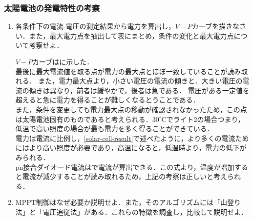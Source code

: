\clearpage
\subsubsection{太陽電池の発電特性の考察}
\begin{enumerate}[(1)]
	\item 各条件下の電流-電圧の測定結果から電力を算出し，$V-P$カーブを描きなさい．また，最大電力点を抽出して表にまとめ，条件の変化と最大電力点について考察せよ．
	
	$V-P$カーブはに示した．\\
	最後に最大電流値を取る点が電力の最大点とほぼ一致していることが読み取れる．
	また，電力最大点より，小さい電圧の電流の傾きと．大きい電圧の電流の傾きは異なり，前者は緩やかで，後者は急である．
	電圧がある一定値を超えると急に電力を得ることが難しくなるとうことである．\\
	また，条件を変更しても電力最大点の移動が確認されなかったため，この点は太陽電池固有のものであると考えられる．$30^{\circ}$Cでライト2の場合つまり，低温で高い照度の場合が最も電力を多く得ることができている．\\
	電力は電流に比例し，\ref{solar-cell-result}で述べたように，より多くの電流ためにはより高い照度が必要であり，高温になると，低温時より，電力の低下がみられる．\\
	pn接合ダイオード電流はで電流が算出できる．この式より，温度が増加すると電流が減少することが読み取れるため，上記の考察は正しいと考えられる．
	\item MPPT制御はなぜ必要か説明せよ．また，そのアルゴリズムには「山登り法」と「電圧追従法」がある．これらの特徴を調査し，比較して説明せよ．
	

\end{enumerate}
